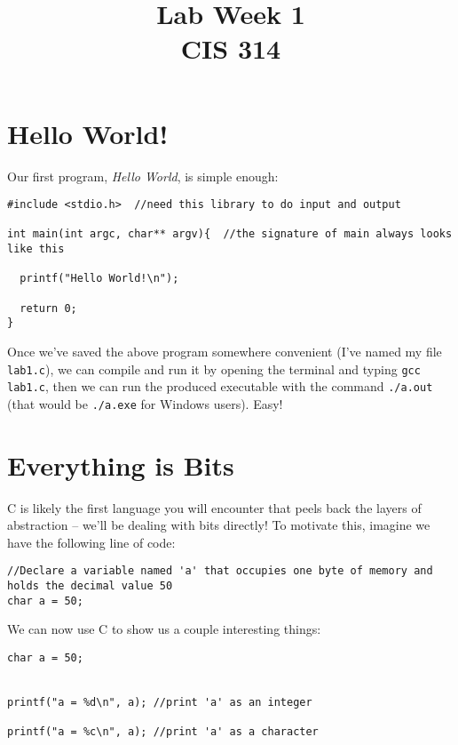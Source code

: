 \documentclass[10pt]{article}
\begin{document}
\title{Lab Week \raisebox{.22ex}{\large\#}1 \\
	CIS 314}
\author{}

\maketitle

\section*{Hello World!}

Our first program, \textit{Hello World}, is simple enough:

\begin{lstlisting}
#include <stdio.h>  //need this library to do input and output

int main(int argc, char** argv){  //the signature of main always looks like this
  
  printf("Hello World!\n");

  return 0;
}
\end{lstlisting}

\noindent Once we've saved the above program somewhere convenient (I've named my file \texttt{lab1.c}), we can compile and run it by opening the terminal and typing \texttt{gcc lab1.c}, then we can run the produced executable with the command \texttt{./a.out} (that would be \texttt{./a.exe} for Windows users). Easy!



\section*{Everything is Bits}

C is likely the first language you will encounter that peels back the layers of abstraction -- we'll be dealing with bits directly! To motivate this, imagine we have the following line of code:

\begin{lstlisting}
//Declare a variable named 'a' that occupies one byte of memory and holds the decimal value 50
char a = 50;

\end{lstlisting}

\noindent We can now use C to show us a couple interesting things:

\begin{lstlisting}
char a = 50;


printf("a = %d\n", a); //print 'a' as an integer

printf("a = %c\n", a); //print 'a' as a character

\end{lstlisting}
\end{document}
